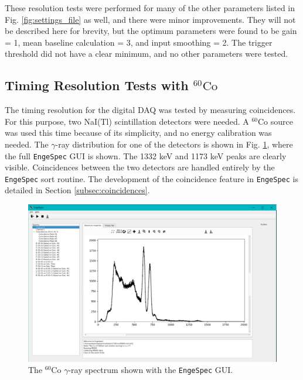 These resolution tests were performed for many of the other parameters listed in Fig. \ref{fig:settings_file} as well, and there were minor improvements. They will not be described here for brevity, but the optimum parameters were found to be gain = 1, mean baseline calculation = 3, and input smoothing = 2. The trigger threshold did not have a clear minimum, and no other parameters were tested.

\subsection{Timing Resolution Tests with $^{60}\mathrm{Co}$} \label{subsec:timing_resolution}

The timing resolution for the digital DAQ was tested by measuring coincidences. For this purpose, two NaI(Tl) scintillation detectors were needed. A $^{60}$Co source was used this time because of its simplicity, and no energy calibration was needed. The $\gamma$-ray distribution for one of the detectors is shown in Fig. \ref{fig:Hist_60Co}, where the full \texttt{EngeSpec} GUI is shown. The 1332 keV and 1173 keV peaks are clearly visible. Coincidences between the two detectors are handled entirely by the \texttt{EngeSpec} sort routine. The development of the coincidence feature in \texttt{EngeSpec} is detailed in Section \ref{subsec:coincidences}.

\begin{figure}[t]
\centering
\includegraphics[width=6.5in]{Chapter-5/figs/Histogram_Co60.png}
\caption{\label{fig:Hist_60Co}The $^{60}$Co $\gamma$-ray spectrum shown with the \texttt{EngeSpec} GUI.}
\end{figure}

